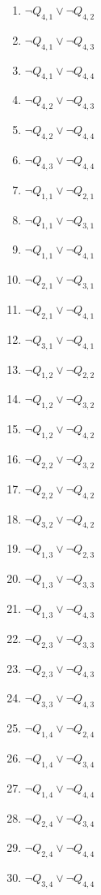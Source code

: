 \documentclass[22pt]{article}
\begin{document}
\begin{multicols}{4}
\begin{enumerate}
	\item $\neg Q_{4,1} \lor \neg Q_{4,2}$
	\item $\neg Q_{4,1} \lor \neg Q_{4,3}$
	\item $\neg Q_{4,1} \lor \neg Q_{4,4}$
	\item $\neg Q_{4,2} \lor \neg Q_{4,3}$
	\item $\neg Q_{4,2} \lor \neg Q_{4,4}$
	\item $\neg Q_{4,3} \lor \neg Q_{4,4}$

	\item $\neg Q_{1,1} \lor \neg Q_{2,1}$
	\item $\neg Q_{1,1} \lor \neg Q_{3,1}$
	\item $\neg Q_{1,1} \lor \neg Q_{4,1}$
	\item $\neg Q_{2,1} \lor \neg Q_{3,1}$
	\item $\neg Q_{2,1} \lor \neg Q_{4,1}$
	\item $\neg Q_{3,1} \lor \neg Q_{4,1}$

	\item $\neg Q_{1,2} \lor \neg Q_{2,2}$
	\item $\neg Q_{1,2} \lor \neg Q_{3,2}$
	\item $\neg Q_{1,2} \lor \neg Q_{4,2}$
	\item $\neg Q_{2,2} \lor \neg Q_{3,2}$
	\item $\neg Q_{2,2} \lor \neg Q_{4,2}$
	\item $\neg Q_{3,2} \lor \neg Q_{4,2}$

	\item $\neg Q_{1,3} \lor \neg Q_{2,3}$
	\item $\neg Q_{1,3} \lor \neg Q_{3,3}$
	\item $\neg Q_{1,3} \lor \neg Q_{4,3}$
	\item $\neg Q_{2,3} \lor \neg Q_{3,3}$
	\item $\neg Q_{2,3} \lor \neg Q_{4,3}$
	\item $\neg Q_{3,3} \lor \neg Q_{4,3}$

	\item $\neg Q_{1,4} \lor \neg Q_{2,4}$
	\item $\neg Q_{1,4} \lor \neg Q_{3,4}$
	\item $\neg Q_{1,4} \lor \neg Q_{4,4}$
	\item $\neg Q_{2,4} \lor \neg Q_{3,4}$
	\item $\neg Q_{2,4} \lor \neg Q_{4,4}$
	\item $\neg Q_{3,4} \lor \neg Q_{4,4}$


\end{enumerate}
\end{multicols}
\end{document}
